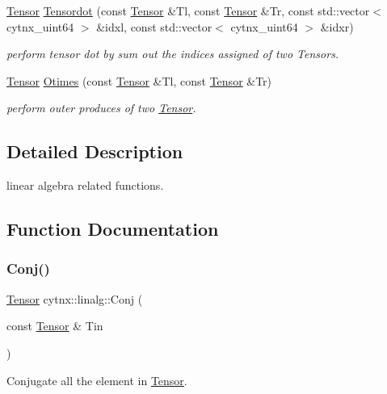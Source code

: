 \begin{DoxyCompactItemize}
\hyperlink{classcytnx_1_1Tensor}{Tensor} \hyperlink{namespacecytnx_1_1linalg_a460e44db6b3d5d2c30c2d2723ff8f788}{Tensordot} (const \hyperlink{classcytnx_1_1Tensor}{Tensor} \&Tl, const \hyperlink{classcytnx_1_1Tensor}{Tensor} \&Tr, const std\+::vector$<$ cytnx\+\_\+uint64 $>$ \&idxl, const std\+::vector$<$ cytnx\+\_\+uint64 $>$ \&idxr)
\begin{DoxyCompactList}\small\item\em perform tensor dot by sum out the indices assigned of two Tensors. \end{DoxyCompactList}\item 
\hyperlink{classcytnx_1_1Tensor}{Tensor} \hyperlink{namespacecytnx_1_1linalg_ac76f4b5f153cdc817de5d33240046e52}{Otimes} (const \hyperlink{classcytnx_1_1Tensor}{Tensor} \&Tl, const \hyperlink{classcytnx_1_1Tensor}{Tensor} \&Tr)
\begin{DoxyCompactList}\small\item\em perform outer produces of two \hyperlink{classcytnx_1_1Tensor}{Tensor}. \end{DoxyCompactList}\end{DoxyCompactItemize}


\subsection{Detailed Description}
linear algebra related functions. 

\subsection{Function Documentation}
\mbox{\label{namespacecytnx_1_1linalg_a470d0886432554a35ecaf961451c0806}} 
\subsubsection{\texorpdfstring{Conj()}{Conj()}}
{\footnotesize\ttfamily \hyperlink{classcytnx_1_1Tensor}{Tensor} cytnx\+::linalg\+::\+Conj (\begin{DoxyParamCaption}\item[{const \hyperlink{classcytnx_1_1Tensor}{Tensor} \&}]{Tin }\end{DoxyParamCaption})}



Conjugate all the element in \hyperlink{classcytnx_1_1Tensor}{Tensor}. 

